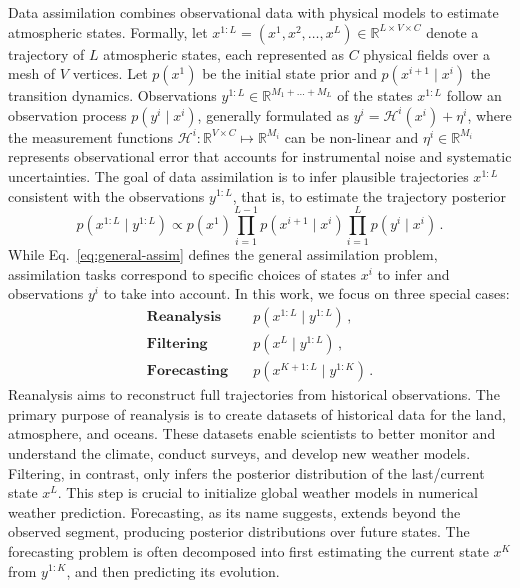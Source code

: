 Data assimilation combines observational data with physical models to estimate atmospheric states. Formally, let $x^{1:L} = (x^1, x^2, \dots, x^L) \in \mathbb{R}^{L \times V \times C}$ denote a trajectory of $L$ atmospheric states, each represented as $C$ physical fields over a mesh of $V$ vertices. Let $p(x^1)$ be the initial state prior and $p(x^{i+1} \mid x^i)$ the transition dynamics. Observations $y^{1:L} \in \mathbb{R}^{M_1 + \dots + M_L}$ of the states $x^{1:L}$ follow an observation process $p(y^i \mid x^i)$, generally formulated as $y^i = \mathcal{H}^i(x^i) + \eta^i$, where the measurement functions $\mathcal{H}^i: \mathbb{R}^{V \times C} \mapsto \mathbb{R}^{M_i}$ can be non-linear and $\eta^i \in \mathbb{R}^{M_i}$ represents observational error that accounts for instrumental noise and systematic uncertainties. The goal of data assimilation is to infer plausible trajectories $x^{1:L}$ consistent with the observations $y^{1:L}$, that is, to estimate the trajectory posterior
\begin{equation} \label{eq:general-assim}
    p(x^{1:L} \mid y^{1:L}) \propto p(x^1) \prod_{i=1}^{L-1} p(x^{i+1} \mid x^i) \prod_{i=1}^{L} p(y^i \mid x^i) \, .
\end{equation}
While Eq.~\eqref{eq:general-assim} defines the general assimilation problem, assimilation tasks correspond to specific choices of states $x^i$ to infer and observations $y^i$ to take into account. In this work, we focus on three special cases:
\begin{align}
    \textbf{Reanalysis}  \quad & p(x^{1:L} \mid y^{1:L}) \, , \label{eq:reanalysis} \\
    \textbf{Filtering}   \quad & p(x^L \mid y^{1:L}) \, , \label{eq:filtering} \\
    \textbf{Forecasting} \quad & p(x^{K+1:L} \mid y^{1:K}) \, . \label{eq:forecast}
\end{align}
Reanalysis aims to reconstruct full trajectories from historical observations. The primary purpose of reanalysis is to create datasets of historical data for the land, atmosphere, and oceans. These datasets enable scientists to better monitor and understand the climate, conduct surveys, and develop new weather models. Filtering, in contrast, only infers the posterior distribution of the last/current state $x^L$. This step is crucial to initialize global weather models in numerical weather prediction. Forecasting, as its name suggests, extends beyond the observed segment, producing posterior distributions over future states. The forecasting problem is often decomposed into first estimating the current state $x^K$ from $y^{1:K}$, and then predicting its evolution.

